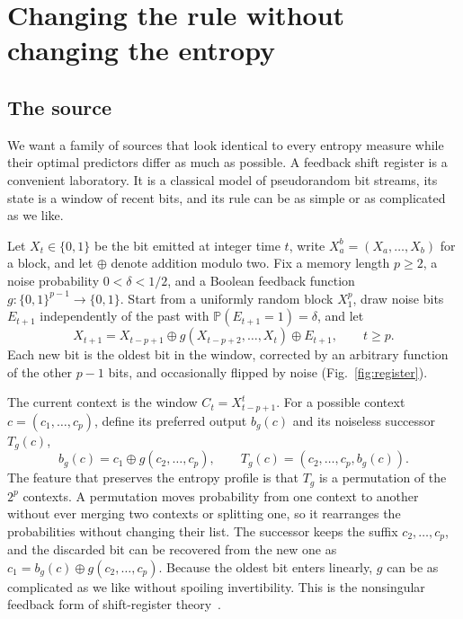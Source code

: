 \documentclass[11pt,a4paper]{article}
\newcommand{\bits}{\{0,1\}}
\newcommand{\PP}{\mathbb{P}}
\begin{document}
\section{Changing the rule without changing the entropy}
\label{sec:family}

\subsection{The source}

We want a family of sources that look identical to every entropy measure while their optimal predictors differ as much as possible. A feedback shift register is a convenient laboratory. It is a classical model of pseudorandom bit streams, its state is a window of recent bits, and its rule can be as simple or as complicated as we like.

Let \(X_t\in\bits\) be the bit emitted at integer time \(t\), write \(X_a^b=(X_a,\ldots,X_b)\) for a block, and let \(\oplus\) denote addition modulo two. Fix a memory length \(p\ge2\), a noise probability \(0<\delta<1/2\), and a Boolean feedback function \(g:\bits^{p-1}\to\bits\). Start from a uniformly random block \(X_1^p\), draw noise bits \(E_{t+1}\) independently of the past with \(\PP(E_{t+1}=1)=\delta\), and let
\begin{equation}
X_{t+1}=X_{t-p+1}\oplus g(X_{t-p+2},\ldots,X_t)\oplus E_{t+1},
\qquad t\ge p .
\label{eq:source}
\end{equation}
Each new bit is the oldest bit in the window, corrected by an arbitrary function of the other \(p-1\) bits, and occasionally flipped by noise (Fig.~\ref{fig:register}).

The current context is the window \(C_t=X_{t-p+1}^t\). For a possible context \(c=(c_1,\ldots,c_p)\), define its preferred output \(b_g(c)\) and its noiseless successor \(T_g(c)\),
\begin{equation}
b_g(c)=c_1\oplus g(c_2,\ldots,c_p),\qquad
T_g(c)=(c_2,\ldots,c_p,b_g(c)).
\label{eq:feedback}
\end{equation}
The feature that preserves the entropy profile is that \(T_g\) is a permutation of the \(2^p\) contexts. A permutation moves probability from one context to another without ever merging two contexts or splitting one, so it rearranges the probabilities without changing their list. The successor keeps the suffix \(c_2,\ldots,c_p\), and the discarded bit can be recovered from the new one as \(c_1=b_g(c)\oplus g(c_2,\ldots,c_p)\). Because the oldest bit enters linearly, \(g\) can be as complicated as we like without spoiling invertibility. This is the nonsingular feedback form of shift-register theory~\cite{golomb2014shift,dabrowski2014searching}.
\end{document}
